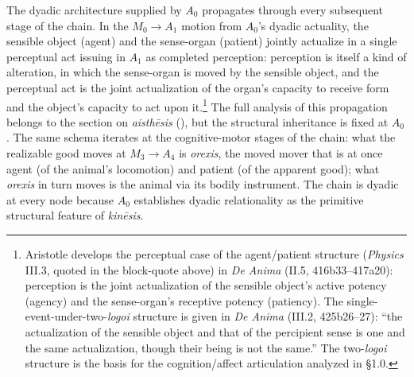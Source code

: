 The dyadic architecture supplied by $A_0$ propagates through every subsequent stage of the chain. In the $M_0 \rightarrow A_1$ motion from $A_0$'s dyadic actuality, the sensible object (agent) and the sense-organ (patient) jointly actualize in a single perceptual act issuing in $A_1$ as completed perception: perception is itself a kind of alteration, in which the sense-organ is moved by the sensible object, and the perceptual act is the joint actualization of the organ's capacity to receive form and the object's capacity to act upon it.\footnote{Aristotle develops the perceptual case of the agent/patient structure (\textit{Physics} III.3, quoted in the block-quote above) in \textit{De Anima} (II.5, 416b33--417a20): perception is the joint actualization of the sensible object's active potency (agency) and the sense-organ's receptive potency (patiency). The single-event-under-two-\textit{logoi} structure is given in \textit{De Anima} (III.2, 425b26--27): ``the actualization of the sensible object and that of the percipient sense is one and the same actualization, though their being is not the same.'' The two-\textit{logoi} structure is the basis for the cognition/affect articulation analyzed in \S 1.0.} The full analysis of this propagation belongs to the section on \textit{aisthēsis} (), but the structural inheritance is fixed at $A_0$. The same schema iterates at the cognitive-motor stages of the chain: what the realizable good moves at $M_3 \rightarrow A_4$ is \textit{orexis}, the moved mover that is at once agent (of the animal's locomotion) and patient (of the apparent good); what \textit{orexis} in turn moves is the animal via its bodily instrument. The chain is dyadic at every node because $A_0$ establishes dyadic relationality as the primitive structural feature of \textit{kinēsis}.

